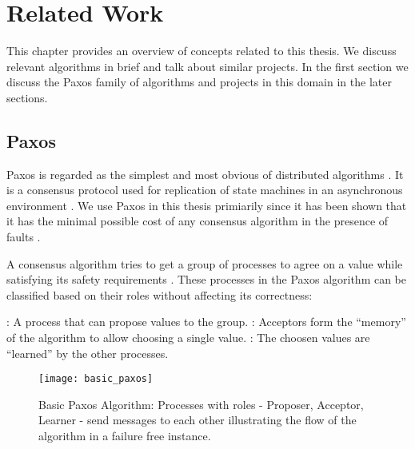 \chapter{Related Work}
\label{chapter:related.work}

This chapter provides an overview of concepts related to this thesis. We
discuss relevant algorithms in brief and talk about similar projects. In the 
first section we discuss the Paxos family of algorithms and projects in 
this domain in the later sections.

\section{Paxos}
\label{section:paxos}

Paxos is regarded as the simplest and most obvious of distributed algorithms 
\citep{Lamport01}. It is a consensus protocol used for replication of state
machines in an asynchronous environment \citep{Lamport98}. We use Paxos in this
thesis primiarily since it has been shown that it has the minimal possible cost 
of any consensus algorithm in the presence of faults \citep{KeidarR03}.

A consensus algorithm tries to get a group of processes to agree on a value 
while satisfying its safety requirements%
. 
These processes in the Paxos algorithm can be classified based on their roles
without affecting its correctness:

\begin{itemize}
  : A process that can propose values to the group. 
  : Acceptors form the ``memory'' of the algorithm to 
    allow choosing a single value.
  : The choosen values are ``learned'' by the other 
    processes.
\end{itemize}

\begin{figure}
  \captionstyle{\raggedright}
  \begin{whole}
    \begin{minipage}[t]{\wholewidth}
      \texttt{[image: basic\_paxos]}
      \caption[Basic Paxos]{%
        Basic Paxos Algorithm: Processes with roles - Proposer, Acceptor, 
        Learner - send messages to each other illustrating the flow of the 
        algorithm in a failure free instance.}
      \label{figure:basic_paxos}
    \end{minipage}
  \end{whole}
  \normalcaption
\end{figure}

